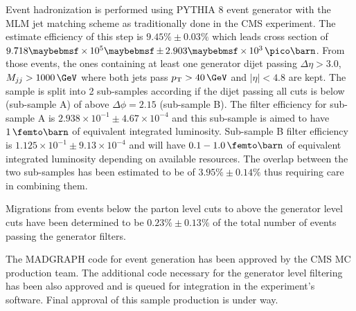 Event hadronization is performed using \textsc{PYTHIA 8} event generator with the MLM jet matching scheme as traditionally done in the \gls{CMS} experiment. The estimate efficiency of this step is $9.45\% \pm 0.03\%$ which leads cross section of $9.718 \times 10^5 \pm 2.903 \times 10^3\,\pico\barn$. From those events, the ones containing at least one generator dijet passing $\Delta\eta > 3.0$, $M_{jj} > 1000\,\GeV$ where both jets pass $\pt > 40\,\GeV$ and $|\eta|<4.8$ are kept. The sample is split into 2 sub-samples according if the dijet passing all cuts is below (sub-sample A) of above $\Delta\phi=2.15$ (sub-sample B). The filter efficiency for sub-sample A is $2.938 \times 10^{-1} \pm 4.67 \times 10^{-4}$ and this sub-sample is aimed to have $1\,\femto\barn$ of equivalent integrated luminosity. Sub-sample B filter efficiency is $1.125 \times 10^{-1} \pm 9.13 \times 10^{-4}$ and will have $0.1-1.0\,\femto\barn$ of equivalent integrated luminosity depending on available resources. The overlap between the two sub-samples has been estimated to be of $3.95\% \pm 0.14\%$ thus requiring care in combining them.

Migrations from events below the parton level cuts to above the generator level cuts have been determined to be $0.23\% \pm 0.13\%$ of the total number of events passing the generator filters.

The \textsc{MADGRAPH} code for event generation has been approved by the \gls{CMS} \gls{MC} production team. The additional code necessary for the generator level filtering has been also approved and is queued for integration in the experiment's software. Final approval of this sample production is under way. 

